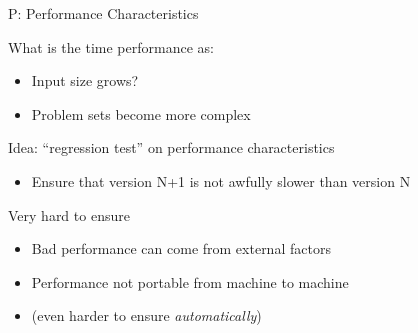 \begin{frame}{P: Performance Characteristics}
  \begin{block}{What is the time performance as:}
    \begin{itemize}
    \item Input size grows?
    \item Problem sets become more complex
    \end{itemize}
  \end{block}

  \begin{block}{Idea: ``regression test'' on performance characteristics}
    \begin{itemize}
    \item Ensure that version N+1 is not awfully slower than version N
    \end{itemize}
  \end{block}

  \begin{block}{Very hard to ensure}
    \begin{itemize}
    \item Bad performance can come from external factors
    \item Performance not portable from machine to machine
    \item (even harder to ensure \textit{automatically})
    \end{itemize}
  \end{block}
\end{frame}
